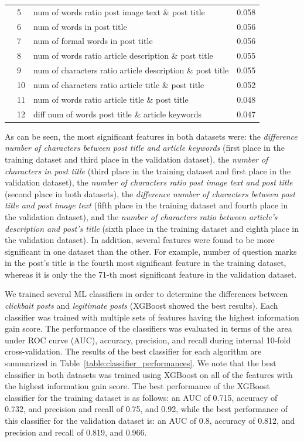 \documentclass{sig-alternate}
\begin{document}
\begin{table}[htb]
{\begin{tabular}{ |m{0.7cm}|m{0.4cm}|m{5.5cm}|m{0.7cm}| }
									  & 5 & num of words ratio post image text \& post title & 0.058 \\
									  & 6 & num of words in post title  & 0.056 \\
									  & 7 & num of formal words in post title & 0.056 \\
									  & 8 & num of words ratio article description \& post title & 0.055 \\ 
									  & 9 & num of characters ratio article description \& post title & 0.055  \\ 
									  & 10 & num of characters ratio article title \& post title & 0.052 \\ 
									  & 11 & num of words ratio article title \& post title & 0.048\\ 
									  & 12 & diff num of words post title \& article keywords  & 0.047\\ \hline
	\end{tabular}
	}
	\label{table:info_gain_results}
	\end{table}

As can be seen, the most significant features in both datasets were: the \emph{difference number of characters between post title and article keywords} (first place in the training dataset and third place in the validation dataset), the \emph{number of characters in post title} (third place in the training dataset and first place in the validation dataset), the \emph{number of characters ratio post image text and post title} (second place in both datasets), the \emph{difference number of characters between post title and post image text} (fifth place in the training dataset and fourth place in the validation dataset), and the \emph{number of characters ratio between article's description and post's title} (sixth place in the training dataset and eighth place in the validation dataset).
In addition, several features were found to be more significant in one dataset than the other. 
For example, number of question marks in the post's title is the fourth most significant feature in the training dataset, whereas it is only the the 71-th most significant feature in the validation dataset.

We trained several ML classifiers in order to determine the differences between \emph{clickbait posts} and \emph{legitimate posts} (XGBoost showed the best results). 
Each classifier was trained with multiple sets of features having the highest information gain score. 
The performance of the classifiers was evaluated in terms of the area under ROC curve (AUC), accuracy, precision, and recall during internal 10-fold cross-validation. 
The results of the best classifier for each algorithm are summarized in Table~\ref{table:classifier_performances}.
We note that the best classifier in both datasets was trained using XGBoost on all of the features with the highest information gain score. 
The best performance of the XGBoost classifier for the training dataset is as follows: an AUC of 0.715, accuracy of 0.732, and precision and recall of 0.75, and 0.92, while the best performance of this classifier for the validation dataset is: an AUC of 0.8, accuracy of 0.812, and precision and recall of 0.819, and 0.966.
\end{document}
